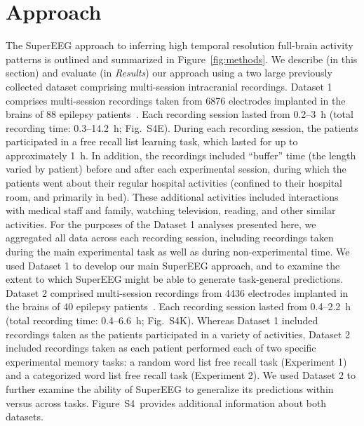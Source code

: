 \documentclass[11pt]{article}
\newcommand{\suppstats}{S4}
\begin{document}
\section*{Approach}
The SuperEEG approach to inferring high temporal resolution full-brain
activity patterns is outlined and summarized in
Figure~\ref{fig:methods}. We describe (in this section) and evaluate
(in \textit{Results}) our approach using a two large previously
collected dataset comprising multi-session intracranial recordings.
Dataset 1 comprises multi-session recordings taken from 6876
electrodes implanted in the brains of 88 epilepsy
patients~\citep{SedeEtal03, SedeEtal07a, SedeEtal07b, MannEtal11,
  MannEtal12}.  Each recording session lasted from 0.2--3~h (total
recording time: 0.3--14.2~h; Fig.~\suppstats E).  During each
recording session, the patients participated in a free recall list
learning task, which lasted for up to approximately 1~h.  In addition,
the recordings included ``buffer'' time (the length varied by patient)
before and after each experimental session, during which the patients
went about their regular hospital activities (confined to their
hospital room, and primarily in bed).  These additional activities
included interactions with medical staff and family, watching
television, reading, and other similar activities.  For the purposes
of the Dataset 1 analyses presented here, we aggregated all data
across each recording session, including recordings taken during the
main experimental task as well as during non-experimental time.  We
used Dataset 1 to develop our main SuperEEG approach, and to examine
the extent to which SuperEEG might be able to generate task-general
predictions.  Dataset 2 comprised multi-session recordings from 4436
electrodes implanted in the brains of 40 epilepsy
patients~\citep{EzzyEtal17, HoraEtal17, KragEtal17, KuceEtal17,
  LinEtal17, SoloEtal18, WeidEtal18, EzzyEtal18, KuceEtal18}.  Each
recording session lasted from 0.4--2.2~h (total recording time:
0.4--6.6~h; Fig.~\suppstats K).  Whereas Dataset 1 included recordings
taken as the patients participated in a variety of activities, Dataset
2 included recordings taken as each patient performed each of two
specific experimental memory tasks: a random word list free recall
task (Experiment 1) and a categorized word list free recall task
(Experiment 2).  We used Dataset 2
to further examine the ability of SuperEEG to generalize its
predictions within versus across tasks.  Figure~\suppstats~provides
additional information about both datasets.
\end{document}
